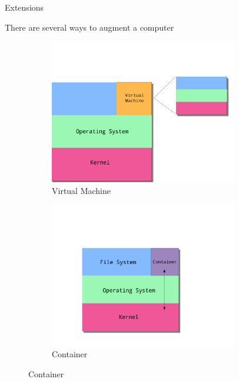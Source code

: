 \documentclass[10pt]{beamer}              %
\begin{document}
\begin{frame}[fragile]{Extensions}

    There are several ways to augment a computer
    
    \begin{figure}
    \centering
    \begin{subfigure}{.5\textwidth}
        \centering
        \includegraphics[width=0.9\textwidth]{media/images/comp-vm.png}
        \caption{Virtual Machine}
    \end{subfigure}%
    \begin{subfigure}{.5\textwidth}
        \centering
        \includegraphics[width=0.9\textwidth]{media/images/comp-container.png}
        \caption{Container}
    \end{subfigure}
    \end{figure}
    

\end{frame}
\end{document}
